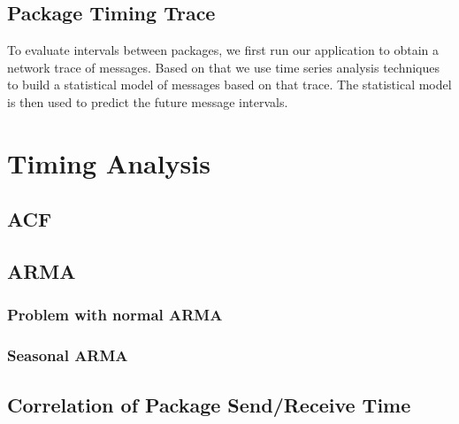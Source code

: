 \documentclass[12pt]{article}
\begin{document}
\subsection{Package Timing Trace}

To evaluate intervals between packages, we first run our application to obtain a
network trace of messages. Based on that we use time series analysis
techniques~\cite{BrillingerTimeSeries, ShumwayTimeSeries} to build a statistical
model of messages based on that trace. The statistical model is then used to
predict the future message intervals.
\section{Timing Analysis}
\subsection{ACF}
\subsection{ARMA}
\subsubsection{Problem with normal ARMA}
\subsubsection{Seasonal ARMA}

\subsection{Correlation of Package Send/Receive Time}



\end{document}
